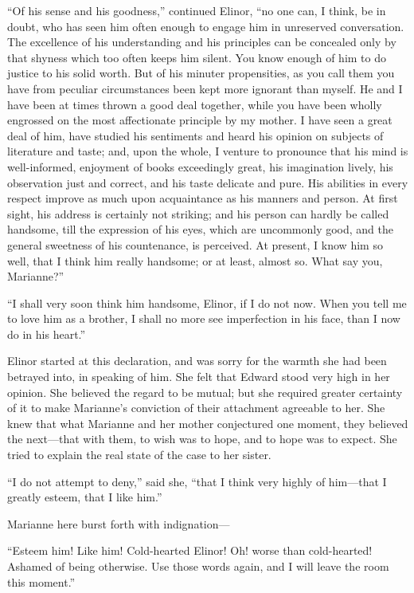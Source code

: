 \documentclass{article}
\begin{document}
``Of his sense and his goodness,'' continued Elinor,
``no one can, I think, be in doubt, who has seen him
often enough to engage him in unreserved conversation.
The excellence of his understanding and his principles
can be concealed only by that shyness which too often
keeps him silent.  You know enough of him to do justice
to his solid worth.  But of his minuter propensities,
as you call them you have from peculiar circumstances
been kept more ignorant than myself.  He and I have
been at times thrown a good deal together, while you
have been wholly engrossed on the most affectionate
principle by my mother.  I have seen a great deal of him,
have studied his sentiments and heard his opinion on
subjects of literature and taste; and, upon the whole,
I venture to pronounce that his mind is well-informed,
enjoyment of books exceedingly great, his imagination lively,
his observation just and correct, and his taste delicate
and pure.  His abilities in every respect improve
as much upon acquaintance as his manners and person.
At first sight, his address is certainly not striking;
and his person can hardly be called handsome, till the
expression of his eyes, which are uncommonly good,
and the general sweetness of his countenance, is perceived.
At present, I know him so well, that I think him
really handsome; or at least, almost so.  What say you,
Marianne?''

``I shall very soon think him handsome, Elinor, if I
do not now.  When you tell me to love him as a brother,
I shall no more see imperfection in his face, than I now do
in his heart.''

Elinor started at this declaration, and was sorry for
the warmth she had been betrayed into, in speaking of him.
She felt that Edward stood very high in her opinion.
She believed the regard to be mutual; but she required
greater certainty of it to make Marianne's conviction
of their attachment agreeable to her.  She knew that
what Marianne and her mother conjectured one moment,
they believed the next---that with them, to wish was to hope,
and to hope was to expect.  She tried to explain the real
state of the case to her sister.

``I do not attempt to deny,'' said she, ``that I think
very highly of him---that I greatly esteem, that I like him.''

Marianne here burst forth with indignation---%

``Esteem him! Like him! Cold-hearted Elinor! Oh!
worse than cold-hearted! Ashamed of being otherwise.
Use those words again, and I will leave the room this moment.''
\end{document}
